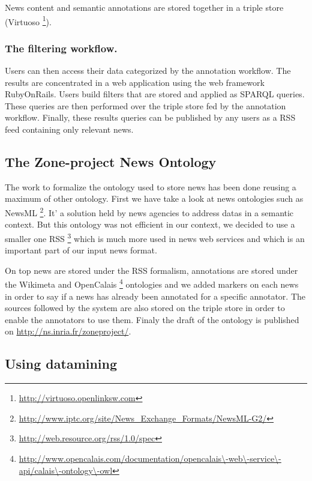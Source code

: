 \documentclass{llncs}
\begin{document}
News content and semantic annotations are stored together in a triple store (Virtuoso \footnote{\url{http://virtuoso.openlinksw.com}}). 


 
\subsubsection{The filtering workflow.}
Users can then access their data categorized by the annotation workflow. The results are concentrated in a web application using the web framework RubyOnRails. Users build filters that are stored and applied as SPARQL queries. These queries are then performed over the triple store fed by the annotation workflow. Finally, these results queries can be published by any users as a RSS feed containing only relevant news.

%
\subsection{The Zone-project News Ontology}
The work to formalize the ontology used to store news has been done reusing a maximum of other ontology. 
First we have take a look at news ontologies such as NewsML \footnote{\url{http://www.iptc.org/site/News\_Exchange\_Formats/NewsML-G2/}}. It' a solution held by news agencies to address datas in a semantic context. But this ontology was not efficient in our context, we decided to use a smaller one RSS \footnote{\url{http://web.resource.org/rss/1.0/spec}} which is much more used in news web services and which is an important part of our input news format. 

On top news are stored under the RSS formalism, annotations are stored under the Wikimeta \cite{charton:nlgbase} and
 OpenCalais \footnote{\url{http://www.opencalais.com/documentation/opencalais\-web\-service\-api/calais\-ontology\-owl}} ontologies and we added markers on each news in order to say if a news has already been annotated for a specific annotator. The sources followed by the system are also stored on the triple store in order to enable the annotators to use them. Finaly the draft of the ontology is published on \url{http://ns.inria.fr/zoneproject/}.

%

%
\subsection{Using datamining}
\end{document}
